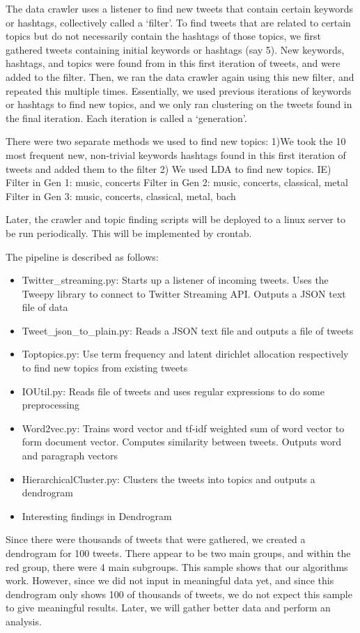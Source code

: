 \documentclass[10pt]{article}
\begin{document}
The data crawler uses a listener to find new tweets that contain certain keywords or hashtags, collectively called a ‘filter’. To find tweets that are related to certain topics but do not necessarily contain the hashtags of those topics, we first gathered tweets containing initial keywords or hashtags (say 5). New keywords, hashtags, and topics were found from in this first iteration of tweets, and were added to the filter. Then, we ran the data crawler again using this new filter, and repeated this multiple times. Essentially, we used previous iterations of keywords or hashtags to find new topics, and we only ran clustering on the tweets found in the final iteration. Each iteration is called a ‘generation’.

There were two separate methods we used to find new topics: 
1)We took the 10 most frequent new, non-trivial keywords hashtags found in this first iteration of tweets and added them to the filter 
2) We used LDA to find new topics. 
IE)
Filter in Gen 1: music, concerts
Filter in Gen 2: music, concerts, classical, metal
Filter in Gen 3: music, concerts, classical, metal, bach

Later, the crawler and topic finding scripts will be deployed to a linux server to be run periodically. This will be implemented by crontab.

The pipeline is described as follows:
\begin{itemize}
	\item Twitter\_streaming.py: Starts up a listener of incoming tweets. Uses the Tweepy library to connect to Twitter Streaming API. Outputs a JSON text file of data
	\item Tweet\_json\_to\_plain.py: Reads a JSON text file and outputs a file of tweets
	\item Toptopics.py: Use term frequency and latent dirichlet allocation respectively to find new topics from existing tweets
	\item IOUtil.py: Reads file of tweets and uses regular expressions to do some preprocessing
	\item Word2vec.py: Trains word vector and tf-idf weighted sum of word vector to form document vector. Computes similarity between tweets. Outputs word and paragraph vectors
	\item HierarchicalCluster.py: Clusters the tweets into topics and outputs a dendrogram
\end{itemize}

\begin{itemize}
	\item Interesting findings in Dendrogram
\end{itemize}
Since there were thousands of tweets that were gathered, we created a dendrogram for 100 tweets. There appear to be two main groups, and within the red group, there were 4 main subgroups. This sample shows that our algorithms work. However, since we did not input in meaningful data yet, and since this dendrogram only shows 100 of thousands of tweets, we do not expect this sample to give meaningful results. Later, we will gather better data and perform an analysis.
\end{document}
